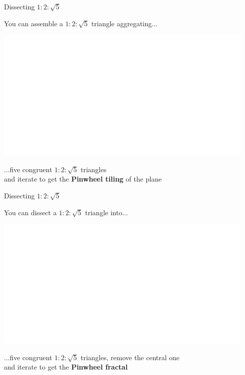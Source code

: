 \documentclass[14pt]{beamer}
\begin{document}

    \begin{frame}{Dissecting $1\!\!:\!\!2\!\!:\!\!\sqrt{5}$}
        \begin{center}
            You can assemble a $1\!\!:\!\!2\!\!:\!\!\sqrt{5}$ triangle aggregating...

            \bigskip \bigskip

            \includegraphics[height=18ex]{figures/figure006g.pdf}

            \bigskip \bigskip

            ...five congruent $1\!\!:\!\!2\!\!:\!\!\sqrt{5}$ triangles\\and iterate to get the \textbf{Pinwheel tiling} of the plane
        \end{center}
    \end{frame}


    \begin{frame}{Dissecting $1\!\!:\!\!2\!\!:\!\!\sqrt{5}$}
        \begin{center}
            You can dissect a $1\!\!:\!\!2\!\!:\!\!\sqrt{5}$ triangle into...

            \bigskip \bigskip

            \includegraphics[height=18ex]{figures/figure006h.pdf}

            \bigskip \bigskip

            ...five congruent $1\!\!:\!\!2\!\!:\!\!\sqrt{5}$ triangles, remove the central one\\and iterate to get the \textbf{Pinwheel fractal}
        \end{center}
    \end{frame}
\end{document}
